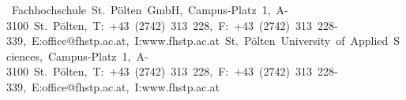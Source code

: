 {\begin{titlepage}
{\vspace{.5cm}

\enlargethispage{3\baselineskip}

\vfill


{\centering
	\sffamily\tiny{\mbox{%
		\ifisGerman
		Fachhochschule St. P\"olten GmbH,  Campus-Platz 1, A-3100 St. P\"olten,%
		T: +43 (2742) 313 228, F: +43 (2742) 313 228-339, E:office@fhstp.ac.at, I:www.fhstp.ac.at%
		\else
		St. P\"olten University of Applied Sciences,  Campus-Platz 1, A-3100 St. P\"olten,%
		T: +43 (2742) 313 228, F: +43 (2742) 313 228-339, E:office@fhstp.ac.at, I:www.fhstp.ac.at%
		\fi
	}}
}


}
\end{titlepage}
}

\makeatother

